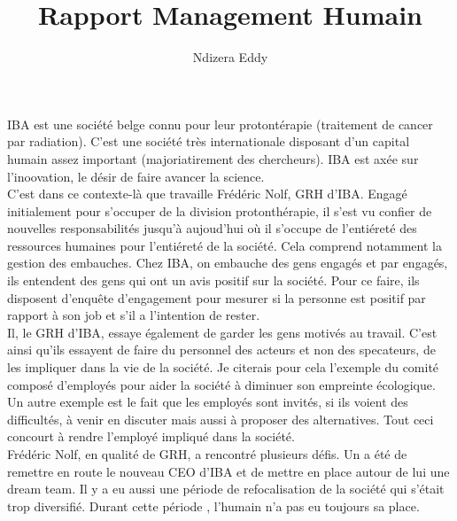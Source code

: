 \documentclass[12pt]{report}
\title{Rapport Management Humain}
\author{Ndizera Eddy}
\begin{document}
\maketitle

IBA est une société belge connu pour leur protontérapie (traitement de cancer par radiation). C'est une société très internationale disposant d'un capital humain assez important (majoriatirement des chercheurs). IBA est axée sur l'inoovation, le désir de faire avancer la science.\\

C'est dans ce contexte-là que travaille Frédéric Nolf, GRH d'IBA. Engagé initialement pour s'occuper de la division protonthérapie, il s'est vu confier de nouvelles responsabilités jusqu'à aujoud'hui où il s'occupe de l'entiéreté des ressources humaines pour l'entiéreté de la société. Cela comprend notamment la gestion des embauches. Chez IBA, on embauche des gens engagés et par engagés, ils entendent des gens qui ont un avis positif sur la société. Pour ce faire, ils disposent d'enquête d'engagement pour mesurer si la personne est positif par rapport à son job et s'il a l'intention de rester.\\

Il, le GRH d'IBA, essaye également de garder les gens motivés au travail. C'est ainsi qu'ils essayent de faire du personnel des acteurs et non des specateurs, de les impliquer dans la vie de la société. Je citerais pour cela l'exemple du comité composé d'employés pour  aider la société à diminuer son empreinte écologique. Un autre exemple est le fait que les employés sont invités, si ils voient des difficultés, à venir en discuter mais aussi à proposer des alternatives. Tout ceci concourt à rendre l'employé impliqué dans la société. \\

Frédéric Nolf, en qualité de GRH, a rencontré plusieurs défis. Un a été de remettre en route le nouveau CEO d'IBA et de mettre en place autour de lui une dream team. Il y a eu aussi une période de refocalisation de la société qui s'était trop diversifié. Durant cette période , l'humain n'a pas eu toujours sa place.\\
\end{document}
